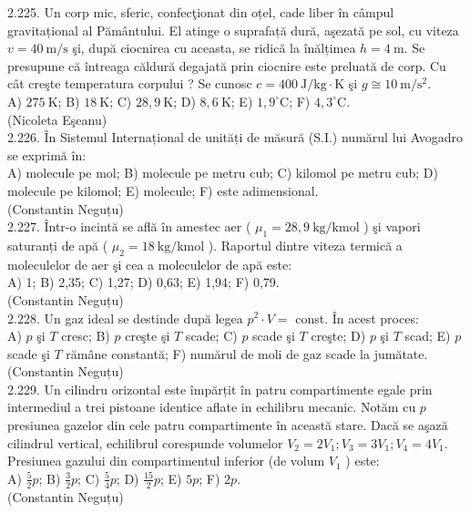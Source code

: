 2.225. Un corp mic, sferic, confecţionat din oțel, cade liber în câmpul gravitațional al Pământului. El atinge o suprafață dură, aşezată pe sol, cu viteza $v=40 \mathrm{~m} / \mathrm{s}$ şi, după ciocnirea cu aceasta, se ridică la înălțimea $h=4 \mathrm{~m}$. Se presupune că întreaga căldură degajată prin ciocnire este preluată de corp. Cu cât creşte temperatura corpului ? Se cunosc $c=400 \mathrm{~J} / \mathrm{kg} \cdot \mathrm{K}$ şi $g \cong 10 \mathrm{~m} / \mathrm{s}^{2}$.\\ A) $275 \mathrm{~K}$; B) $18 \mathrm{~K}$; C) $28,9 \mathrm{~K}$; D) $8,6 \mathrm{~K}$; E) $1,9^{\circ} \mathrm{C}$; F) $4,3^{\circ} \mathrm{C}$.\\ (Nicoleta Eşeanu)\\

2.226. În Sistemul Internațional de unități de măsură (S.I.) numărul lui Avogadro se exprimă în:\\ A) molecule pe mol; B) molecule pe metru cub; C) kilomol pe metru cub; D) molecule pe kilomol; E) molecule; F) este adimensional.\\ (Constantin Neguțu)\\

2.227. Într-o incintă se află în amestec aer ( $\mu_{1}=28,9 \mathrm{~kg} / \mathrm{kmol}$ ) şi vapori saturanți de apă ( $\mu_{2}=18 \mathrm{~kg} / \mathrm{kmol}$ ). Raportul dintre viteza termică a moleculelor de aer şi cea a moleculelor de apă este:\\ A) 1; B) 2,35; C) 1,27; D) 0,63; E) 1,94; F) 0,79.\\ (Constantin Neguțu)\\

2.228. Un gaz ideal se destinde după legea $p^{2} \cdot V=$ const. În acest proces:\\ A) $p$ şi $T$ cresc; B) $p$ creşte şi $T$ scade; C) $p$ scade şi $T$ creşte; D) $p$ şi $T$ scad; E) $p$ scade şi $T$ rămâne constantă; F) numărul de moli de gaz scade la jumătate.\\ (Constantin Neguțu)\\

2.229. Un cilindru orizontal este împărțit în patru compartimente egale prin intermediul a trei pistoane identice aflate in echilibru mecanic. Notăm cu $p$ presiunea gazelor din cele patru compartimente în această stare. Dacă se aşază cilindrul vertical, echilibrul corespunde volumelor $V_{2}=2 V_{1} ; V_{3}=3 V_{1} ; V_{4}=4 V_{1}$. Presiunea gazului din compartimentul inferior (de volum $V_{1}$ ) este:\\ A) $\frac{5}{2} p$; B) $\frac{3}{2} p$; C) $\frac{5}{4} p$; D) $\frac{15}{2} p$; E) $5 p$; F) $2 p$.\\ (Constantin Neguțu)\\


